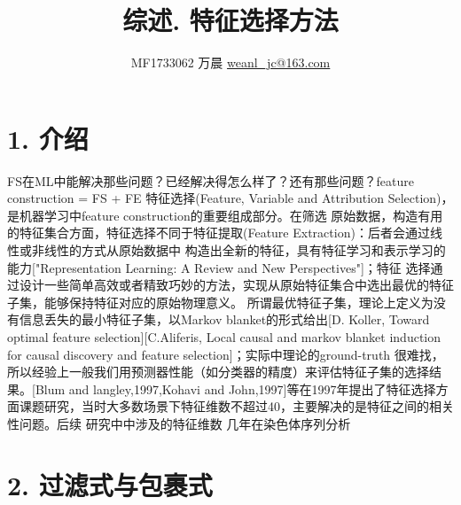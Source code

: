 \documentclass[a4paper,UTF8]{article}
\begin{document}
\title{综述. 特征选择方法}
\author{MF1733062 万晨 \url{weanl_jc@163.com}}
\maketitle

\section*{1. 介绍}
  FS在ML中能解决那些问题？已经解决得怎么样了？还有那些问题？feature construction = FS + FE
  特征选择(Feature, Variable and Attribution Selection)，是机器学习中feature construction的重要组成部分。在筛选
  原始数据，构造有用的特征集合方面，特征选择不同于特征提取(Feature Extraction)：后者会通过线性或非线性的方式从原始数据中
  构造出全新的特征，具有特征学习和表示学习的能力["Representation Learning: A Review and New Perspectives"]；特征
  选择通过设计一些简单高效或者精致巧妙的方法，实现从原始特征集合中选出最优的特征子集，能够保持特征对应的原始物理意义。
  所谓最优特征子集，理论上定义为没有信息丢失的最小特征子集，以Markov blanket的形式给出[D. Koller, Toward optimal feature selection][C.Aliferis, Local
  causal and markov blanket induction for causal discovery and feature selection]；实际中理论的ground-truth
  很难找，所以经验上一般我们用预测器性能（如分类器的精度）来评估特征子集的选择结果。[Blum and langley,1997,Kohavi and
  John,1997]等在1997年提出了特征选择方面课题研究，当时大多数场景下特征维数不超过40，主要解决的是特征之间的相关性问题。后续
  研究中中涉及的特征维数
  几年在染色体序列分析





\section*{2. 过滤式与包裹式}
\end{document}

